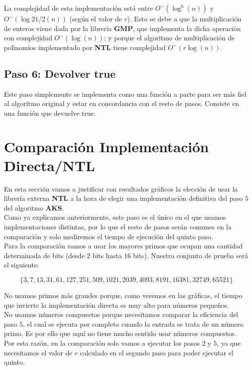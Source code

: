La complejidad de esta implementación está entre $O^\sim(\log^6(n))$ y $O^\sim(\log{21/2}(n))$ (según el valor de $r$). Esto se debe a que la multiplicación de enteros viene dada por la librería \textbf{GMP}, que implementa la dicha operación con complejidad $O^\sim(\log(n))$; y porque el algoritmo de multiplicación de polinomios implementado por \textbf{NTL} tiene complejidad $O^\sim(r\log(n))$.

\subsection{Paso 6: Devolver true}

Este paso simplemente se implementa como una función a parte para ser más fiel al algoritmo original y estar en concordancia con el resto de pasos. Consiste en una función que devuelve true.

\section{Comparación Implementación Directa/NTL}

En esta sección vamos a justificar con resultados gráficos la elección de usar la librería externa \textbf{NTL} a la hora de elegir una implementación definitiva del paso $5$ del algoritmo \textbf{AKS}.\\

Como ya explicamos anteriormente, este paso es el único en el que usamos implementaciones distintas, por lo que el resto de pasos serán comunes en la comparación y solo mediremos el tiempo de ejecución del quinto paso.\\

Para la comparación vamos a usar los mayores primos que ocupan una cantidad determinada de bits (desde $2$ bits hasta $16$ bits). Nuestro conjunto de prueba será el siguiente:

\[ \{ 3, 7, 13, 31, 61, 127, 251, 509,
1021, 2039, 4093, 8191, 16381, 32749,
65521 \} \]

No usamos primos más grandes porque, como veremos en las gráficas, el tiempo que invierte la implementación directa es muy alto para números pequeños.\\

No usamos números compuestos porque necesitamos comparar la eficiencia del paso $5$, el cual se ejecuta por completo cuando la entrada se trata de un número primo. Es por ello que aquí no tiene mucho sentido usar números compuestos. Por esta razón, en la comparación solo vamos a ejecutar los pasos $2$ y $5$, ya que necesitamos el valor de $r$ calculado en el segundo paso para poder ejecutar el quinto.

